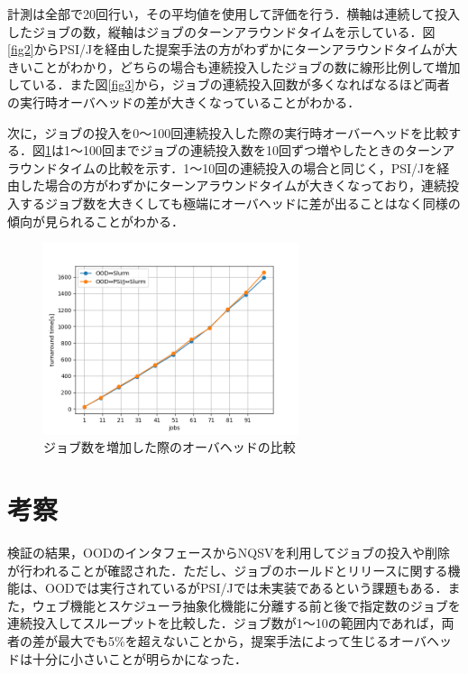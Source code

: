 \documentclass[a4paper,oneside,twocolumn,notitlepage,dvipdfmx]{jsarticle}
\begin{document}
計測は全部で20回行い，その平均値を使用して評価を行う．横軸は連続して投入したジョブの数，縦軸はジョブのターンアラウンドタイムを示している．図\ref{fig2}からPSI/Jを経由した提案手法の方がわずかにターンアラウンドタイムが大きいことがわかり，どちらの場合も連続投入したジョブの数に線形比例して増加している．また図\ref{fig3}から，ジョブの連続投入回数が多くなればなるほど両者の実行時オーバヘッドの差が大きくなっていることがわかる．\par
次に，ジョブの投入を0～100回連続投入した際の実行時オーバーヘッドを比較する．図\ref{fig5}は1～100回までジョブの連続投入数を10回ずつ増やしたときのターンアラウンドタイムの比較を示す．1～10回の連続投入の場合と同じく，PSI/Jを経由した場合の方がわずかにターンアラウンドタイムが大きくなっており，連続投入するジョブ数を大きくしても極端にオーバヘッドに差が出ることはなく同様の傾向が見られることがわかる．\par

\begin{figure}[h]
  \centering
  \includegraphics[width=75mm]{./fig/100jobs.png}
  \caption{ジョブ数を増加した際のオーバヘッドの比較}
  \label{fig5}
\end{figure}

\section{考察}
検証の結果，OODのインタフェースからNQSVを利用してジョブの投入や削除が行われることが確認された．ただし、ジョブのホールドとリリースに関する機能は、OODでは実行されているがPSI/Jでは未実装であるという課題もある．また，ウェブ機能とスケジューラ抽象化機能に分離する前と後で指定数のジョブを連続投入してスループットを比較した．ジョブ数が1～10の範囲内であれば，両者の差が最大でも5\%を超えないことから，提案手法によって生じるオーバヘッドは十分に小さいことが明らかになった．\par
\end{document}
